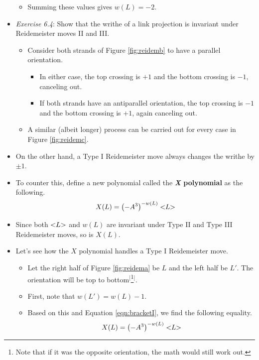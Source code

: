 \documentclass[titlepage]{article}
\numberwithin{figure}{section}
\numberwithin{table}{section}
\numberwithin{equation}{section}
\newcommand{\lbq}{<\hspace{-3pt}}
\newcommand{\rbq}{\hspace{-3pt}>}
\begin{document}
\begin{itemize}
\begin{itemize}
        \item Summing these values gives $w(L)=-2$.
    \end{itemize}
    \item \emph{Exercise 6.4}: Show that the writhe of a link projection is invariant under Reidemeister moves II and III.
    \begin{itemize}
        \item Consider both strands of Figure \ref{fig:reidemb} to have a parallel orientation.
        \begin{itemize}
            \item In either case, the top crossing is $+1$ and the bottom crossing is $-1$, canceling out.
            \item If both strands have an antiparallel orientation, the top crossing is $-1$ and the bottom crossing is $+1$, again canceling out.
        \end{itemize}
        \item A similar (albeit longer) process can be carried out for every case in Figure \ref{fig:reidemc}.
    \end{itemize}
    \item On the other hand, a Type I Reidemeister move always changes the writhe by $\pm 1$.
    \item To counter this, define a new polynomial called the \textbf{\emph{X} polynomial} as the following.
    \begin{equation}\label{eqn:XL}
        X(L)=\left( -A^3 \right)^{-w(L)}\lbq L\rbq
    \end{equation}
    \item Since both $\lbq L\rbq$ and $w(L)$ are invariant under Type II and Type III Reidemeister moves, so is $X(L)$.
    \item Let's see how the $X$ polynomial handles a Type I Reidemeister move.
    \begin{itemize}
        \item Let the right half of Figure \ref{fig:reidema} be $L$ and the left half be $L'$. The orientation will be top to bottom$^[$\footnote{Note that if it was the opposite orientation, the math would still work out.}$^]$.
        \item First, note that $w(L')=w(L)-1$.
        \item Based on this and Equation \ref{eqn:bracketI}, we find the following equality.
        \begin{align*}
            X(L) &= \left( -A^3 \right)^{-w(L)}\lbq L\rbq\\

\end{align*}
\end{itemize}
\end{itemize}
\end{document}
